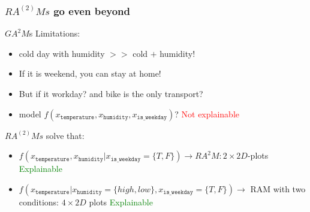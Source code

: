 \documentclass{beamer}
\begin{document}
\begin{frame}
  \frametitle{$RA^{(2)}Ms$ go even beyond}

  $GA^2M$s Limitations:
  \begin{itemize}
  \item<2-> cold day with humidity $>>$ cold $+$ humidity!
  \item<3-> If it is weekend, you can stay at home!
  \item<4-> But if it workday? and bike is the only transport?
  \item<5-> model $f(x_{\mathtt{temperature}}, x_{\mathtt{humidity}}, x_{\mathtt{is\_weekday}})$?  {\textcolor{red}{Not explainable}}
  \end{itemize}

  \noindent\makebox[\linewidth]{\rule{\paperwidth}{0.4pt}}

  $RA^{(2)}Ms$ solve that:

  \begin{itemize}
  \item<7-> \(f(x_{\mathtt{temperature}}, x_{\mathtt{humidity}} | x_{\mathtt{is\_weekday}} = \{T, F\}) \rightarrow RA^2M: 2 \times 2D\)-plots  {\textcolor{green}{Explainable}}
    \item<8-> \(f(x_{\mathtt{temperature}}| x_{\mathtt{humidity}} = \{high, low\}, x_{\mathtt{is\_weekday}} = \{T, F\}) \rightarrow\) RAM with two conditions: $4 \times 2D$ plots  {\textcolor{green}{Explainable}}
  \end{itemize}

\end{frame}
\end{document}
